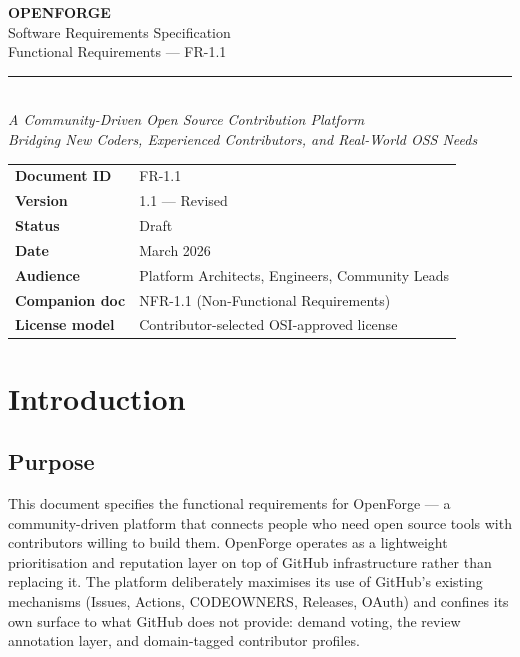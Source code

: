 \documentclass[12pt,a4paper]{article}
\begin{document}
\thispagestyle{empty}
\begin{center}
  \vspace*{3cm}
  {\fontsize{42}{50}\selectfont\bfseries\color{ofblue} OPENFORGE}\\[0.6em]
  {\Large\color{ofaccent} Software Requirements Specification}\\[0.3em]
  {\large\color{ofaccent} Functional Requirements --- FR-1.1}\\[1.5em]
  \color{ofrule}\rule{0.6\textwidth}{1.2pt}\\[1.5em]
  {\normalsize\itshape\color{ofgray}
    A Community-Driven Open Source Contribution Platform\\[0.3em]
    Bridging New Coders, Experienced Contributors, and Real-World OSS Needs
  }\\[3cm]
  \begin{tabular}{L{3.5cm} L{8cm}}
    \textbf{\color{ofblue}Document ID}   & FR-1.1 \\
    \textbf{\color{ofblue}Version}       & 1.1 --- Revised \\
    \textbf{\color{ofblue}Status}        & Draft \\
    \textbf{\color{ofblue}Date}          & March 2026 \\
    \textbf{\color{ofblue}Audience}      & Platform Architects, Engineers, Community Leads \\
    \textbf{\color{ofblue}Companion doc} & NFR-1.1 (Non-Functional Requirements) \\
    \textbf{\color{ofblue}License model} & Contributor-selected OSI-approved license \\
  \end{tabular}
\end{center}
\newpage

\tableofcontents
\newpage

\section{Introduction}

\subsection{Purpose}
This document specifies the functional requirements for OpenForge --- a community-driven platform that connects people who need open source tools with contributors willing to build them. OpenForge operates as a lightweight prioritisation and reputation layer on top of GitHub infrastructure rather than replacing it. The platform deliberately maximises its use of GitHub's existing mechanisms (Issues, Actions, CODEOWNERS, Releases, OAuth) and confines its own surface to what GitHub does not provide: demand voting, the review annotation layer, and domain-tagged contributor profiles.
\end{document}
